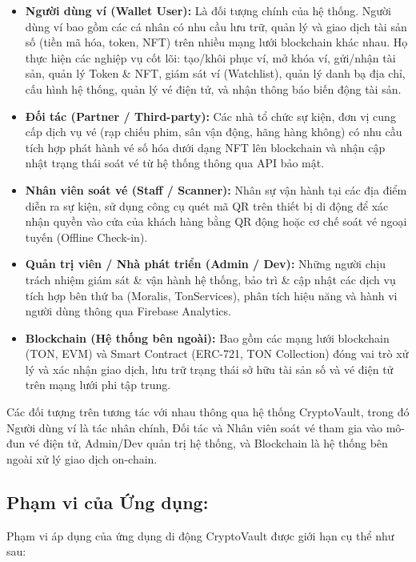 \documentclass[a4paper]{report}
\begin{document}
\begin{itemize}
    \item \textbf{Người dùng ví (Wallet User):} Là đối tượng chính của hệ thống. Người dùng ví bao gồm các cá nhân có nhu cầu lưu trữ, quản lý và giao dịch tài sản số (tiền mã hóa, token, NFT) trên nhiều mạng lưới blockchain khác nhau. Họ thực hiện các nghiệp vụ cốt lõi: tạo/khôi phục ví, mở khóa ví, gửi/nhận tài sản, quản lý Token \& NFT, giám sát ví (Watchlist), quản lý danh bạ địa chỉ, cấu hình hệ thống, quản lý vé điện tử, và nhận thông báo biến động tài sản.
    
    \item \textbf{Đối tác (Partner / Third-party):} Các nhà tổ chức sự kiện, đơn vị cung cấp dịch vụ vé (rạp chiếu phim, sân vận động, hãng hàng không) có nhu cầu tích hợp phát hành vé số hóa dưới dạng NFT lên blockchain và nhận cập nhật trạng thái soát vé từ hệ thống thông qua API bảo mật.
    
    \item \textbf{Nhân viên soát vé (Staff / Scanner):} Nhân sự vận hành tại các địa điểm diễn ra sự kiện, sử dụng công cụ quét mã QR trên thiết bị di động để xác nhận quyền vào cửa của khách hàng bằng QR động hoặc cơ chế soát vé ngoại tuyến (Offline Check-in).
    
    \item \textbf{Quản trị viên / Nhà phát triển (Admin / Dev):} Những người chịu trách nhiệm giám sát \& vận hành hệ thống, bảo trì \& cập nhật các dịch vụ tích hợp bên thứ ba (Moralis, TonServices), phân tích hiệu năng và hành vi người dùng thông qua Firebase Analytics.
    
    \item \textbf{Blockchain (Hệ thống bên ngoài):} Bao gồm các mạng lưới blockchain (TON, EVM) và Smart Contract (ERC-721, TON Collection) đóng vai trò xử lý và xác nhận giao dịch, lưu trữ trạng thái sở hữu tài sản số và vé điện tử trên mạng lưới phi tập trung.
\end{itemize}

Các đối tượng trên tương tác với nhau thông qua hệ thống CryptoVault, trong đó Người dùng ví là tác nhân chính, Đối tác và Nhân viên soát vé tham gia vào mô-đun vé điện tử, Admin/Dev quản trị hệ thống, và Blockchain là hệ thống bên ngoài xử lý giao dịch on-chain.

\subsection{Phạm vi của Ứng dụng:} 
Phạm vi áp dụng của ứng dụng di động CryptoVault được giới hạn cụ thể như sau:
\end{document}
